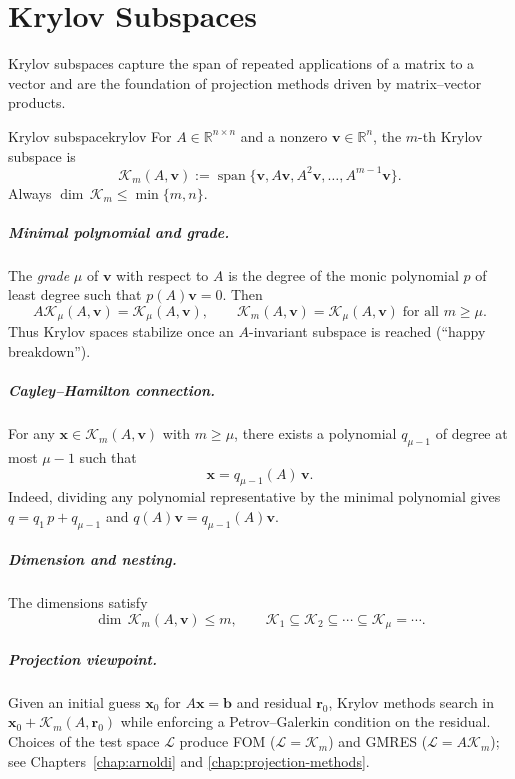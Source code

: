 \chapter{Krylov Subspaces}
\label{chap:krylov}

Krylov subspaces capture the span of repeated applications of a matrix to a vector and are the foundation of projection methods driven by matrix--vector products.

\begin{definition}{Krylov subspace}{krylov}
  For $A\in\mathbb{R}^{n\times n}$ and a nonzero $\mathbf{v}\in\mathbb{R}^n$, the $m$-th Krylov subspace is
  \[
    \mathcal{K}_m(A,\mathbf{v}) := \operatorname{span}\{\mathbf{v},A\mathbf{v},A^2\mathbf{v},\ldots,A^{m-1}\mathbf{v}\}.
  \]
  Always $\dim\,\mathcal{K}_m\le \min\{m,n\}$.
\end{definition}

\paragraph{Minimal polynomial and grade.} The \emph{grade} $\mu$ of $\mathbf{v}$ with respect to $A$ is the degree of the monic polynomial $p$ of least degree such that $p(A)\mathbf{v}=0$. Then
\[
  A\mathcal{K}_\mu(A,\mathbf{v}) = \mathcal{K}_\mu(A,\mathbf{v}),\qquad \mathcal{K}_m(A,\mathbf{v})=\mathcal{K}_\mu(A,\mathbf{v})\;\text{for all }m\ge \mu.
\]
Thus Krylov spaces stabilize once an $A$-invariant subspace is reached (``happy breakdown'').

\paragraph{Cayley--Hamilton connection.} For any $\mathbf{x}\in\mathcal{K}_m(A,\mathbf{v})$ with $m\ge\mu$, there exists a polynomial $q_{\mu-1}$ of degree at most $\mu-1$ such that
\[
  \mathbf{x}=q_{\mu-1}(A)\,\mathbf{v}.
\]
Indeed, dividing any polynomial representative by the minimal polynomial gives $q=q_1\,p+q_{\mu-1}$ and $q(A)\mathbf{v}=q_{\mu-1}(A)\mathbf{v}$.

\paragraph{Dimension and nesting.} The dimensions satisfy
\[
  \dim\,\mathcal{K}_m(A,\mathbf{v})\le m,\qquad \mathcal{K}_1\subseteq\mathcal{K}_2\subseteq\cdots\subseteq\mathcal{K}_\mu=\cdots.
\]

\paragraph{Projection viewpoint.} Given an initial guess $\mathbf{x}_0$ for $A\mathbf{x}=\mathbf{b}$ and residual $\mathbf{r}_0$, Krylov methods search in $\mathbf{x}_0+\mathcal{K}_m(A,\mathbf{r}_0)$ while enforcing a Petrov--Galerkin condition on the residual. Choices of the test space $\mathcal{L}$ produce FOM ($\mathcal{L}=\mathcal{K}_m$) and GMRES ($\mathcal{L}=A\mathcal{K}_m$); see Chapters~\ref{chap:arnoldi} and \ref{chap:projection-methods}.

